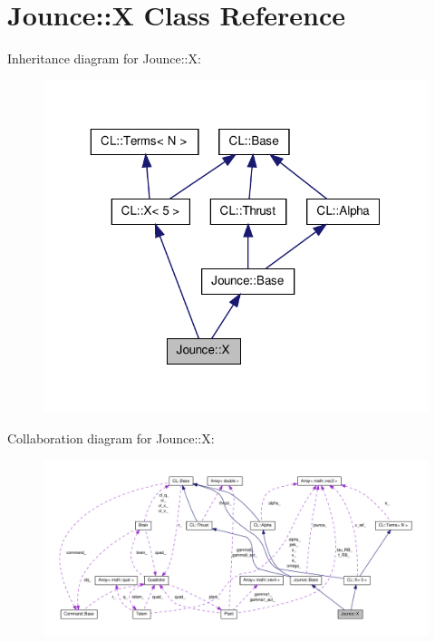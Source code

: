 \hypertarget{classJounce_1_1X}{\section{\-Jounce\-:\-:\-X \-Class \-Reference}
\label{classJounce_1_1X}
}


\-Inheritance diagram for \-Jounce\-:\-:\-X\-:\nopagebreak
\begin{figure}[H]
\begin{center}
\leavevmode
\includegraphics[width=319pt]{classJounce_1_1X__inherit__graph}
\end{center}
\end{figure}


\-Collaboration diagram for \-Jounce\-:\-:\-X\-:\nopagebreak
\begin{figure}[H]
\begin{center}
\leavevmode
\includegraphics[width=350pt]{classJounce_1_1X__coll__graph}
\end{center}
\end{figure}
